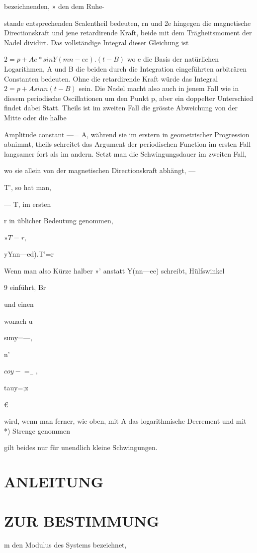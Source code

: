 \documentclass[12pt,a4paper]{article}
\begin{document}
bezeichnenden, » den dem Ruhe-

stande entsprechenden Scalentheil bedeuten, rn und 2e hingegen die magnetische Directionskraft und jene retardirende Kraft, beide mit dem Trägheitsmoment der Nadel dividirt. Das vollständige Integral dieser Gleichung ist

$2 = p+Ae*sinY(mn-ee).(t- B)$ wo e die Basis der natürlichen Logarithmen, A und B die beiden durch die Integration eingeführten arbiträren Constanten bedeuten. Ohne die retardirende Kraft würde das Integral $2 = p+Asinn(t-B)$ sein. Die Nadel macht also auch in jenem Fall wie in diesem periodische Oscillationen um den Punkt p, aber ein doppelter Unterschied findet dabei Statt. Theils ist im zweiten Fall die grösste Abweichung von der Mitte oder die halbe

Amplitude constant —= A, während sie im erstern in geometrischer Progression abnimmt, theils schreitet das Argument der periodischen Function im ersten Fall langsamer fort als im andern. Setzt man die Schwingungsdauer im zweiten Fall,

wo sie allein von der magnetischen Directionskraft abhängt, —

T’, so hat man,

— T, im ersten

r in üblicher Bedeutung genommen,

$»T=r,$

yYnn—ed).T’=r

Wenn man also Kürze halber »’ anstatt Y(nn—ee) schreibt, Hülfswinkel

9 einführt, Br

und einen

wonach u

sımy=—,

n'

$coy-=_-,$

tauy=;z

€

wird, wenn man ferner, wie oben, mit A das logarithmische Decrement und mit *) Strenge genommen

gilt beides nur für unendlich kleine Schwingungen.

\section*{ANLEITUNG}
\section*{ZUR BESTIMMUNG}
m den Modulus des Systems bezeichnet,
\end{document}
